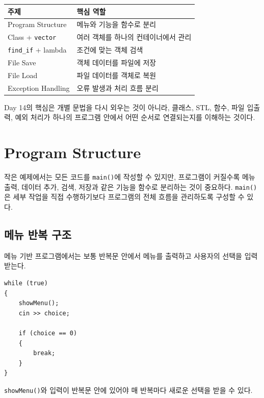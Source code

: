 \documentclass[11pt,a4paper]{article}
\begin{document}
\begin{center}
\begin{tabular}{ll}
\toprule
주제 & 핵심 역할 \\
\midrule
Program Structure & 메뉴와 기능을 함수로 분리 \\
Class + \texttt{vector} & 여러 객체를 하나의 컨테이너에서 관리 \\
\texttt{find\_if} + lambda & 조건에 맞는 객체 검색 \\
File Save & 객체 데이터를 파일에 저장 \\
File Load & 파일 데이터를 객체로 복원 \\
Exception Handling & 오류 발생과 처리 흐름 분리 \\
\bottomrule
\end{tabular}
\end{center}

\begin{importantbox}
Day 14의 핵심은 개별 문법을 다시 외우는 것이 아니라,
클래스, STL, 함수, 파일 입출력, 예외 처리가 하나의 프로그램 안에서 어떤 순서로 연결되는지를 이해하는 것이다.
\end{importantbox}

\section{Program Structure}
작은 예제에서는 모든 코드를 \texttt{main()}에 작성할 수 있지만,
프로그램이 커질수록 메뉴 출력, 데이터 추가, 검색, 저장과 같은 기능을 함수로 분리하는 것이 중요하다.
\texttt{main()}은 세부 작업을 직접 수행하기보다 프로그램의 전체 흐름을 관리하도록 구성할 수 있다.

\subsection{메뉴 반복 구조}
메뉴 기반 프로그램에서는 보통 반복문 안에서 메뉴를 출력하고 사용자의 선택을 입력받는다.

\begin{lstlisting}
while (true)
{
    showMenu();
    cin >> choice;

    if (choice == 0)
    {
        break;
    }
}
\end{lstlisting}

\texttt{showMenu()}와 입력이 반복문 안에 있어야 매 반복마다 새로운 선택을 받을 수 있다.
\end{document}
